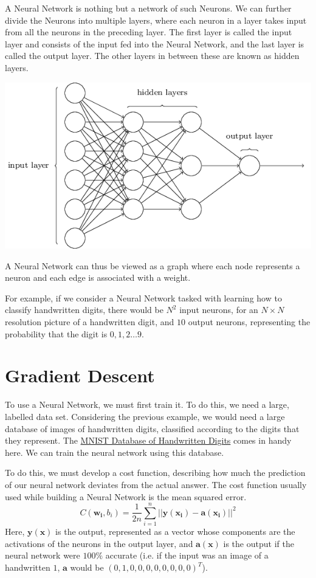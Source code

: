 \documentclass[12 pt]{report}
\begin{document}
    A Neural Network is nothing but a network of such Neurons. We can further divide the Neurons into multiple layers, where each neuron in a layer 
    takes input from all the neurons in the preceding layer.
    The first layer is called the input layer and consists of the input fed into the Neural Network, and the last layer is called the output layer.
    The other layers in between these are known as hidden layers.

    \begin{center}
        \includegraphics[width=15cm]{neural-network.png}
    \end{center}
    A Neural Network can thus be viewed as a graph where each node represents a neuron and each edge is associated with a weight.


    For example, if we consider a Neural Network tasked with learning how to classify handwritten digits, there would be $N^{2}$ input neurons, for 
    an $N \times N$ resolution picture of a handwritten digit, and $10$ output neurons, representing the probability that the digit is $0, 1, 2 \dots 9$.

    \section{Gradient Descent}
    To use a Neural Network, we must first train it. To do this, we need a large, labelled data set. Considering the previous example, we would need 
    a large database of images of handwritten digits, classified according to the digits that they represent. 
    The \href{http://yann.lecun.com/exdb/mnist/}{MNIST Database of Handwritten Digits} comes in handy here. We can train the neural network using
    this database.

    To do this, we must develop a cost function, describing how much the prediction of our neural network deviates from the actual answer. The cost 
    function usually used while building a Neural Network is the mean squared error.
    \begin{equation}
        C(\bm{w_{i}}, b_{i}) = \frac{1}{2n}\sum_{i = 1}^{n} ||\bm{y}(\bm{x_{i}}) - \bm{a}(\bm{x_{i}})||^{2}
    \end{equation}
    Here, $\bm{y}(\bm{x})$ is the output, represented as a vector whose components are the activations of the neurons in the output layer, and $\bm{a}(\bm{x})$ 
    is the output if the neural network were $100\%$ accurate (i.e. if the input was an image of a handwritten $1$, $\bm{a}$ would be $(0, 1, 0, 0, 0, 0, 0, 0, 0, 0)^{T}$).
\end{document}
